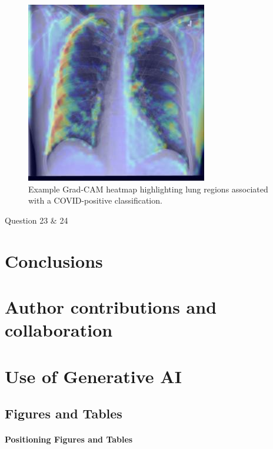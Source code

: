 \documentclass[conference]{IEEEtran}
\begin{document}
\begin{figure}[h] \centering \includegraphics[width=0.8\columnwidth]{gradcam_example.png} \caption{Example Grad-CAM heatmap highlighting lung regions associated with a COVID-positive classification.} \label{fig:gradcam_example} \end{figure}

\+Question 23 \& 24

\section{Conclusions}
\section{Author contributions and collaboration}
\section{Use of Generative AI}


\subsection{Figures and Tables}
\paragraph{Positioning Figures and Tables}
\end{document}
